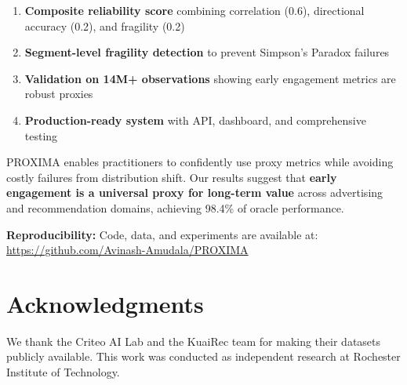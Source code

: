 \documentclass[11pt,twocolumn]{article}
\begin{document}
\begin{enumerate}
    \item \textbf{Composite reliability score} combining correlation (0.6), directional accuracy (0.2), and fragility (0.2)
    \item \textbf{Segment-level fragility detection} to prevent Simpson's Paradox failures
    \item \textbf{Validation on 14M+ observations} showing early engagement metrics are robust proxies
    \item \textbf{Production-ready system} with API, dashboard, and comprehensive testing
\end{enumerate}

PROXIMA enables practitioners to confidently use proxy metrics while avoiding costly failures from distribution shift. Our results suggest that \textbf{early engagement is a universal proxy for long-term value} across advertising and recommendation domains, achieving 98.4\% of oracle performance.

\textbf{Reproducibility:} Code, data, and experiments are available at: \url{https://github.com/Avinash-Amudala/PROXIMA}

\section*{Acknowledgments}

We thank the Criteo AI Lab and the KuaiRec team for making their datasets publicly available. This work was conducted as independent research at Rochester Institute of Technology.
\end{document}

